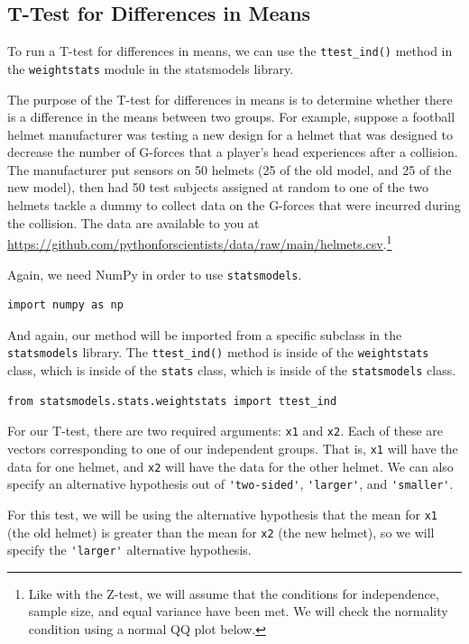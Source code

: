 \subsection{T-Test for Differences in Means}
To run a T-test for differences in means, we can use the \verb|ttest_ind()| method in the \verb|weightstats| module in the statsmodels library.\par
The purpose of the T-test for differences in means is to determine whether there is a difference in the means between two groups. For example, suppose a football helmet manufacturer was testing a new design for a helmet that was designed to decrease the number of G-forces that a player's head experiences after a collision. The manufacturer put sensors on 50 helmets (25 of the old model, and 25 of the new model), then had 50 test subjects assigned at random to one of the two helmets tackle a dummy to collect data on the G-forces that were incurred during the collision. The data are available to you at \\\href{https://github.com/pythonforscientists/data/raw/main/helmets.csv}{https://github.com/pythonforscientists/data/raw/main/helmets.csv}.\footnote{Like with the Z-test, we will assume that the conditions for independence, sample size, and equal variance have been met. We will check the normality condition using a normal QQ plot below.}\par
Again, we need NumPy in order to use \verb|statsmodels|.\par
\begin{lstlisting}[style=pippython]
import numpy as np
\end{lstlisting}
And again, our method will be imported from a specific subclass in the \verb|statsmodels| library. The \verb|ttest_ind()| method is inside of the \verb|weightstats| class, which is inside of the \verb|stats| class, which is inside of the \verb|statsmodels| class.
\begin{lstlisting}[style=pippython]
from statsmodels.stats.weightstats import ttest_ind
\end{lstlisting}
For our T-test, there are two required arguments: \verb|x1| and \verb|x2|. Each of these are vectors corresponding to one of our independent groups. That is, \verb|x1| will have the data for one helmet, and \verb|x2| will have the data for the other helmet. We can also specify an alternative hypothesis out of \verb|'two-sided'|, \verb|'larger'|, and \verb|'smaller'|.\par
For this test, we will be using the alternative hypothesis that the mean for \verb|x1| (the old helmet) is greater than the mean for \verb|x2| (the new helmet), so we will specify the \verb|'larger'| alternative hypothesis.\par
